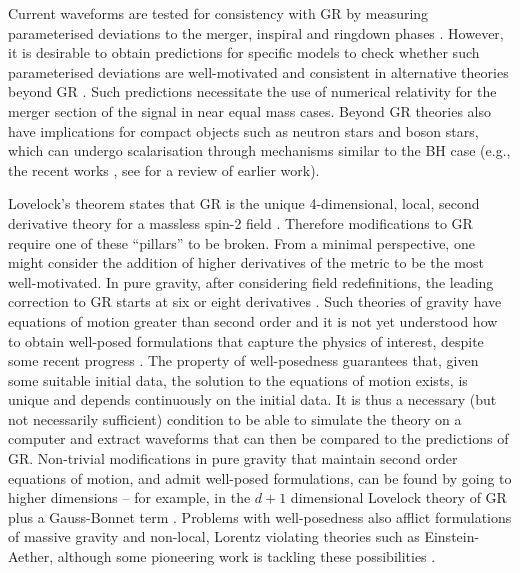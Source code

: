 \documentclass[reprint,aps,amsmath,amssymb,twoside,prd,showkeys,superscriptaddress,nofootinbib]{revtex4-2}
\begin{document}
Current waveforms are tested for consistency with GR by measuring parameterised deviations to the merger, inspiral and ringdown phases \cite{Maggio:2022hre,Krishnendu:2021fga, LIGOScientific:2021sio,Carson:2019kkh,Cornish:2011ys}. However, it is desirable to obtain predictions for specific models to check whether such parameterised deviations are well-motivated and consistent in alternative theories beyond GR \cite{LISA:2022kgy, Okounkova:2022grv, Johnson-McDaniel:2021yge,Shiralilou:2021mfl,Perkins:2021mhb,Carson:2020ter,Carson:2020cqb}. Such predictions necessitate the use of numerical relativity for the merger section of the signal in near equal mass cases. 
Beyond GR theories also have implications for compact objects such as neutron stars and boson stars, which can undergo scalarisation through mechanisms similar to the BH case (e.g., the recent works \cite{Kuan:2023trn, Ma:2023sok}, see \cite{Doneva:2022ewd} for a review of earlier work).

Lovelock's theorem states that GR is the unique 4-dimensional, local, second derivative theory for a massless spin-2 field \cite{Lanczos:1938sf,Lovelock:1972vz,Lovelock:1971yv}. Therefore modifications to GR require one of these ``pillars'' to be broken. 
From a minimal perspective, one might consider the addition of higher derivatives of the metric to be the most well-motivated. In pure gravity, after considering field redefinitions, the leading correction to GR starts at six or eight derivatives \cite{Endlich:2017tqa}. Such theories of gravity have equations of motion greater than second order and it is not yet understood how to obtain well-posed formulations that capture the physics of interest, despite some recent progress \cite{Cayuso:2017iqc,Allwright:2018rut,Cayuso:2020lca,Franchini:2022ukz,Cayuso:2023aht}. 
The property of well-posedness guarantees that, given some suitable initial data, the solution to the equations of motion exists, is unique and depends continuously on the initial data. It is thus a necessary (but not necessarily sufficient) condition to be able to simulate the theory on a computer and extract waveforms that can then be compared to the predictions of GR.  
Non-trivial modifications in pure gravity that maintain second order equations of motion, and admit well-posed formulations, can be found by going to higher dimensions -- for example, in the $d+1$ dimensional Lovelock theory of GR plus a Gauss-Bonnet term \cite{Lovelock:1971yv}.
Problems with well-posedness also afflict formulations of massive gravity and non-local, Lorentz violating theories such as Einstein-Aether, although some pioneering work is tackling these possibilities \cite{Sarbach:2019yso,deRham:2023ngf}.
\end{document}
